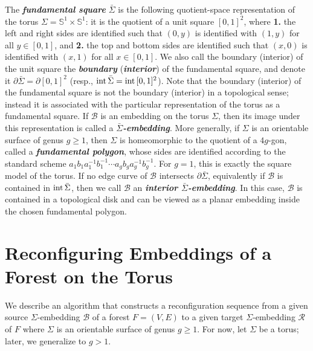 \documentclass[a4paper,USenglish,cleveref,colorlinks=true,urlcolor=black,linkcolor=black,citecolor=black,thm-restate,authorcolumns]{lipics-v2021}
\theoremstyle{claimstyle}
\def\defn#1{\textit{\textbf{\boldmath #1}}}
\renewcommand{\emph}[1]{\defn{#1}}
\begin{document}
The \emph{fundamental square} $\bar{\Sigma}$
is the following quotient-space representation of the torus $\Sigma=\mathbb{S}^1\times \mathbb{S}^1$: it is the quotient of a unit square $[0,1]^2$, where
\textbf{1.} the left and right sides are identified such that $(0,y)$ is identified with $(1,y)$ for all $y\in [0,1]$, and
\textbf{2.} the top and bottom sides are identified such that $(x,0)$ is identified with $(x,1)$ for all $x\in [0,1]$.
We also call the boundary (interior) of the unit square the \emph{boundary} (\emph{interior}) of the fundamental square, and denote it $\partial \bar{\Sigma} =\partial [0,1]^2$ (resp., ${\rm int}\,\bar{\Sigma} = {\rm int}\,[0,1]^2$).
Note that the boundary (interior) of the fundamental square is not the boundary (interior) in a topological sense; instead it is associated with the particular representation of the torus as a fundamental square.
%
If $\mathcal{B}$ is an embedding on the torus $\Sigma$, then its image under this representation is called a \emph{$\bar{\Sigma}$-embedding}.
More generally, if $\Sigma$ is an orientable surface of genus $g\geq 1$, then $\Sigma$ is homeomorphic to the quotient of a $4g$-gon, called a \emph{fundamental polygon}, whose sides are identified according to the standard scheme
$a_1b_1a_1^{-1}b_1^{-1}\cdots a_gb_ga_g^{-1}b_g^{-1}$.
For $g=1$, this is exactly the square model of the torus.
If no edge curve of $\mathcal{B}$ intersects $\partial\bar{\Sigma}$, equivalently if $\mathcal{B}$ is contained in ${\rm int}\,\bar{\Sigma}$, then we call $\mathcal{B}$ an \emph{interior $\bar{\Sigma}$-embedding}.
In this case, $\mathcal{B}$ is contained in a topological disk and can be viewed as a planar embedding inside the chosen fundamental polygon.

\section{Reconfiguring Embeddings of a Forest on the Torus}
\label{sec:torus}

We describe an algorithm that constructs a reconfiguration sequence from a given source $\Sigma$-embedding $\mathcal{B}$ of a forest $F=(V,E)$ to a given target $\Sigma$-embedding $\mathcal{R}$ of $F$ where $\Sigma$ is an orientable surface of genus $g \geq 1$.
For now, let  $\Sigma$ be a torus; later, we generalize to $g>1$.
\end{document}
